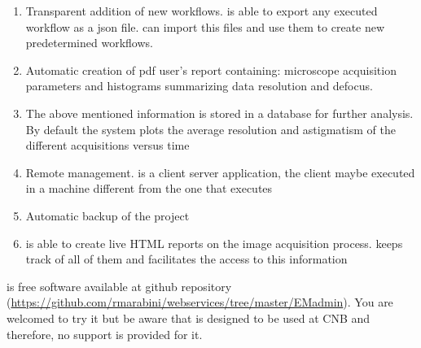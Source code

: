 \begin{enumerate}
 \item Transparent addition of new workflows. \scipion is able to export any executed workflow as a json file. \emadmin can import this files and use them to create new predetermined workflows.
 \item Automatic creation of pdf user's report containing: microscope acquisition parameters and histograms summarizing data resolution and  defocus. 
 \item The above mentioned information is stored in a database for further analysis. By default the system plots the  average resolution and astigmatism of the different acquisitions versus time
 \item Remote management. \emadmin is a client server application, the client maybe executed in a machine different from the one that executes \scipion
 \item Automatic backup of the \scipion project
 \item \scipion is able to create live HTML reports on the image acquisition process. \emadmin keeps track of all of them and facilitates the access to this information
\end{enumerate}

\emadmin is free software available at github repository (\url{https://github.com/rmarabini/webservices/tree/master/EMadmin}). You are welcomed to try it but be aware that \emadmin is designed to be used at CNB and therefore, no support is provided for it.

